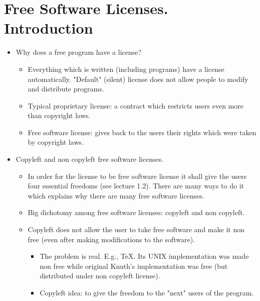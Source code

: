 \documentclass[twoside,openright]{report}
\begin{document}
\section{Free Software Licenses. Introduction}
\begin{itemize}
\item    Why does a free program have a license?
\begin{itemize}
 \item        Everything which is written (including programs) have a license automatically. "Default" (silent) license does not allow people to modify and distribute programs.
 \item        Typical proprietary license: a contract which restricts users even more than copyright laws.
 \item        Free software license: gives back to the users their rights which were taken by copyright laws.
\end{itemize}
 \item    Copyleft and non copyleft free software licenses.
\begin{itemize}
 \item        In order for the license to be free software license it shall give the users four essential freedoms (see lecture 1.2). There are many ways to do it which explains why there are many free software licenses.
 \item        Big dichotomy among free software licenses: copyleft and non copyleft.
 \item        Copyleft does not allow the user to take free software and make it non free (even after making modifications to the software).
\begin{itemize}
 \item            The problem is real. E.g., TeX. Its UNIX implementation was made non free while original Knuth's implementation was free (but distributed under non copyleft license).
 \item            Copyleft idea: to give the freedom to the "next" users of the program.
\end{itemize}
\end{itemize}
\end{itemize}
\end{document}
